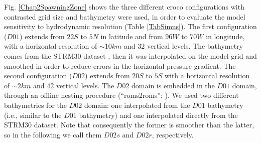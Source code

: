 Fig. \ref{Chap2SpawningZone} shows the three different \acrshort{croco} configurations with contrasted grid size and bathymetry were used, in order to evaluate the model sensitivity to hydrodynamic resolution (Table \ref{TabSimus}). The first configuration ($D01$) extends from $22$\textdegree $S$ to $5$\textdegree $N$ in latitude and from $96$\textdegree $W$ to $70$\textdegree $W$ in longitude, with a horizontal resolution of $\sim 10 km$ and $32$ vertical levels. The bathymetry comes from the STRM30 dataset \citep{BeckSand2009}, then it was interpolated on the model grid and smoothed in order to reduce errors in the horizontal pressure gradient. The second configuration ($D02$) extends from $20$\textdegree $S$ to $5$\textdegree $S$ with a horizontal resolution of $\sim 2km$ and $42$ vertical levels. The $D02$ domain is embedded in the $D01$ domain, through an offline nesting procedure (``roms2roms''; \cite{MasoMole2010}). We used two different bathymetries for the $D02$ domain: one interpolated from the $D01$ bathymetry (i.e., similar to the $D01$ bathymetry) and one interpolated directly from the STRM30 dataset. Note that consequently the former is smoother than the latter, so in the following we call them $D02s$ and $D02r$, respectively.\\

